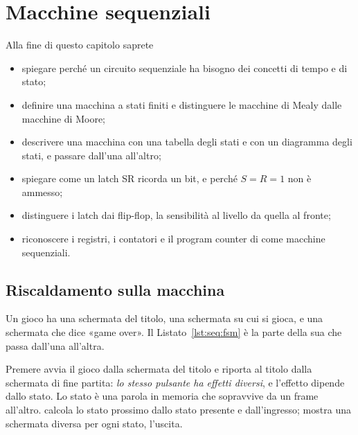 \chapter{Macchine sequenziali}
\label{ch:sequential}


\begin{chapgoals}
Alla fine di questo capitolo saprete
\begin{itemize}
\item spiegare perché un circuito sequenziale ha bisogno dei concetti di tempo e di stato;
\item definire una macchina a stati finiti e distinguere le macchine di Mealy dalle macchine di Moore;
\item descrivere una macchina con una tabella degli stati e con un diagramma degli stati, e passare dall'una all'altro;
\item spiegare come un latch SR ricorda un bit, e perché $S=R=1$ non è ammesso;
\item distinguere i latch dai flip-flop, la sensibilità al livello da quella al fronte;
\item riconoscere i registri, i contatori e il program counter di \riscv come macchine sequenziali.
\end{itemize}
\end{chapgoals}


\section{Riscaldamento sulla macchina}

Un gioco ha una schermata del titolo, una schermata su cui si gioca, e una
schermata che dice «game over». Il Listato~\ref{lst:seq:fsm} è la parte della
sua  che passa dall'una all'altra.


Premere  avvia il gioco dalla schermata del titolo e riporta al titolo
dalla schermata di fine partita: \emph{lo stesso pulsante ha effetti diversi},
e l'effetto dipende dallo stato. Lo stato è una parola in memoria che
sopravvive da un frame all'altro.  calcola lo stato prossimo dallo
stato presente e dall'ingresso;  mostra una schermata diversa per
ogni stato, l'uscita.

